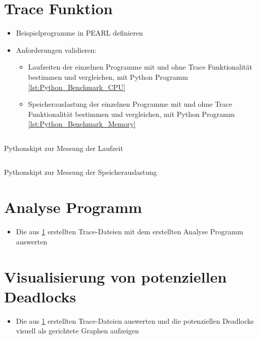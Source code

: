 \section{Trace Funktion}\label{Validierung:Trace Funktion}
\begin{itemize}
  \item Beispielprogramme in PEARL definieren
  \item Anforderungen validieren:
  \begin{itemize}
    \item Laufzeiten der einzelnen Programme mit und ohne Trace Funktionalität
    bestimmen und vergleichen, mit Python Programm \cref{lst:Python_Benchmark_CPU}
    \item Speicherauslastung der einzelnen Programme mit und ohne Trace
    Funktionalität bestimmen und vergleichen, mit Python Programm \cref{lst:Python_Benchmark_Memory}
  \end{itemize}
\end{itemize}

\begin{listing}[ht]
  \inputminted[frame=lines,linenos]{python}{./Python/benchmark_cpu.py}
  \caption{Pythonskipt zur Messung der Laufzeit}
  \label{lst:Python_Benchmark_CPU}   
\end{listing} 

\begin{listing}[ht]
  \inputminted[frame=lines,linenos]{python}{./Python/benchmark_memory.py}
  \caption{Pythonskipt zur Messung der Speicherauslastung}
  \label{lst:Python_Benchmark_Memory}   
\end{listing} 

\section{Analyse Programm}
\begin{itemize}
  \item Die aus \cref{Validierung:Trace Funktion} erstellten Trace-Dateien mit
  dem erstellten Analyse Programm auswerten
\end{itemize}

\section{Visualisierung von potenziellen Deadlocks}
\begin{itemize}
  \item Die aus \cref{Validierung:Trace Funktion} erstellten Trace-Dateien
  auswerten und die potenziellen Deadlocks visuell als gerichtete Graphen
  aufzeigen
\end{itemize}